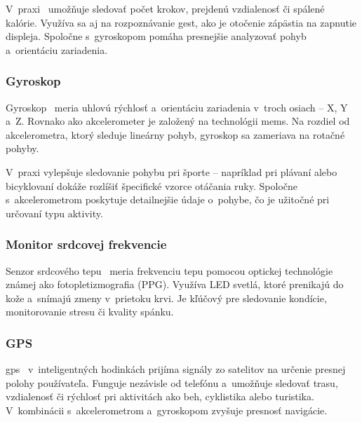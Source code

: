 V~praxi~\cite{sensors-article} umožňuje sledovať počet
krokov, prejdenú vzdialenosť či spálené kalórie. Využíva
sa aj na rozpoznávanie gest, ako je otočenie zápästia na
zapnutie displeja. Spoločne s~gyroskopom pomáha
presnejšie analyzovať pohyb a~orientáciu zariadenia.

\subsubsection{Gyroskop}
Gyroskop~\cite{sensors-article} meria uhlovú rýchlosť
a~orientáciu zariadenia v~troch osiach -- X, Y a~Z.
Rovnako ako akcelerometer je založený na technológii \Gls{mems}.
Na rozdiel od akcelerometra, ktorý sleduje lineárny
pohyb, gyroskop sa zameriava na rotačné pohyby.

V~praxi vylepšuje sledovanie pohybu
pri športe \cite{sensors-article} -- napríklad pri plávaní alebo bicyklovaní
dokáže rozlíšiť špecifické vzorce otáčania ruky.
Spoločne s~akcelerometrom poskytuje detailnejšie údaje
o~pohybe, čo je užitočné pri určovaní typu aktivity.

\subsubsection{Monitor srdcovej frekvencie}

Senzor srdcového tepu~\cite{sensors-article} meria
frekvenciu tepu pomocou optickej technológie známej ako
fotopletizmografia (PPG). Využíva LED svetlá, ktoré
prenikajú do kože a~snímajú zmeny v~prietoku krvi.
Je kľúčový pre sledovanie kondície, monitorovanie stresu
či kvality spánku.

\subsubsection{GPS}

\Gls{gps}~\cite{sensors-article} v~inteligentných
hodinkách prijíma signály zo satelitov na určenie presnej
polohy používateľa. Funguje nezávisle od telefónu
a~umožňuje sledovať trasu, vzdialenosť či rýchlosť
pri aktivitách ako beh, cyklistika alebo turistika.
V~kombinácii s~akcelerometrom a~gyroskopom zvyšuje
presnosť navigácie.